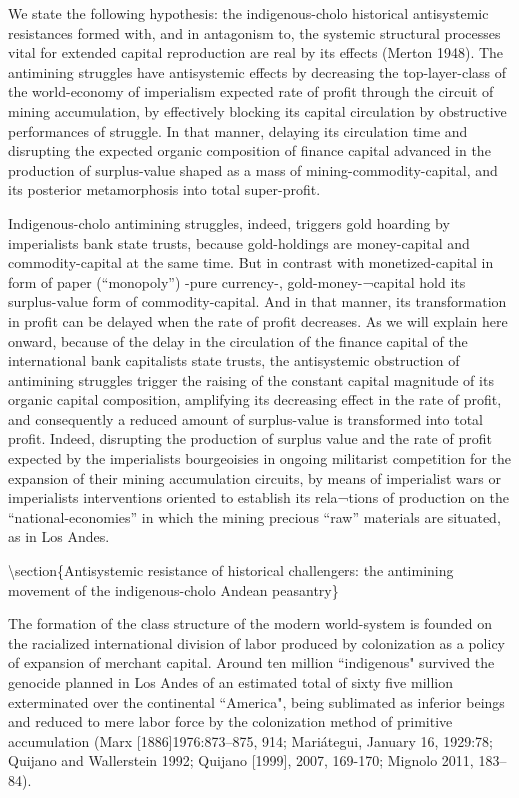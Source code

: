 \documentclass[
]{article}
\begin{document}
We state the following hypothesis: the indigenous-cholo historical
antisystemic resistances formed with, and in antagonism to, the systemic
structural processes vital for extended capital reproduction are real by
its effects (Merton 1948). The antimining struggles have antisystemic
effects by decreasing the top-layer-class of the world-economy of
imperialism expected rate of profit through the circuit of mining
accumulation, by effectively blocking its capital circulation by
obstructive performances of struggle. In that manner, delaying its
circulation time and disrupting the expected organic composition of
finance capital advanced in the production of surplus-value shaped as a
mass of mining-commodity-capital, and its posterior metamorphosis into
total super-profit.

Indigenous-cholo antimining struggles, indeed, triggers gold hoarding by
imperialists bank state trusts, because gold-holdings are money-capital
and commodity-capital at the same time. But in contrast with
monetized-capital in form of paper (``monopoly'') -pure currency-,
gold-money-¬capital hold its surplus-value form of commodity-capital.
And in that manner, its transformation in profit can be delayed when the
rate of profit decreases. As we will explain here onward, because of the
delay in the circulation of the finance capital of the international
bank capitalists state trusts, the antisystemic obstruction of
antimining struggles trigger the raising of the constant capital
magnitude of its organic capital composition, amplifying its decreasing
effect in the rate of profit, and consequently a reduced amount of
surplus-value is transformed into total profit. Indeed, disrupting the
production of surplus value and the rate of profit expected by the
imperialists bourgeoisies in ongoing militarist competition for the
expansion of their mining accumulation circuits, by means of imperialist
wars or imperialists interventions oriented to establish its rela¬tions
of production on the ``national-economies'' in which the mining precious
``raw'' materials are situated, as in Los Andes.

\textbackslash section\{Antisystemic resistance of historical
challengers: the antimining movement of the indigenous-cholo Andean
peasantry\}

The formation of the class structure of the modern world-system is
founded on the racialized international division of labor produced by
colonization as a policy of expansion of merchant capital. Around ten
million ``indigenous" survived the genocide planned in Los Andes of an
estimated total of sixty five million exterminated over the continental
``America", being sublimated as inferior beings and reduced to mere
labor force by the colonization method of primitive accumulation (Marx
{[}1886{]}1976:873--875, 914; Mariátegui, January 16, 1929:78; Quijano
and Wallerstein 1992; Quijano {[}1999{]}, 2007, 169-170; Mignolo 2011,
183--84).
\end{document}
